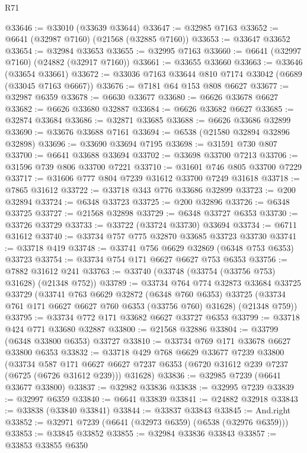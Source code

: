 \begin{lexlean}{R71}
\begin{coremodule}
@33646 := @33010 (@33639 @33644)
@33647 := @32985 @7163
@33652 := @6641 (@32987 @7160) (@21568 (@32885 @7160))
@33653 := @33647 @33652
@33654 := @32984 @33653
@33655 := @32995 @7163
@33660 := @6641 (@32997 @7160) (@24882 (@32917 @7160))
@33661 := @33655 @33660
@33663 := @33646 (@33654 @33661)
@33672 := @33036 @7163 @33644 @810 @7174 @33042 (@6689 (@33045 @7163 @6667))
@33676 := @7181 @64 @153 @808 @6627
@33677 := @32987 @6359
@33678 := @6630 @33677
@33680 := @6626 @33678 @6627
@33682 := @6626 @33680 @32887
@33684 := @6626 @33682 @6627
@33685 := @32874 @33684
@33686 := @32871 @33685
@33688 := @6626 @33686 @32899
@33690 := @33676 @33688 @7161
@33694 := @6538 (@21580 @32894 @32896 @32898)
@33696 := @33690 @33694 @7195
@33698 := @31591 @730 @807
@33700 := @6641 @33688 @33694
@33702 := @33698 @33700 @7213
@33706 := @31596 @739 @806 @33700 @7221
@33710 := @31601 @746 @805 @33700 @7229
@33717 := @31606 @777 @804 @7239 @31612 @33700 @7249 @31618
@33718 := @7865 @31612
@33722 := @33718 @343 @776 @33686 @32899
@33723 := @200 @32894
@33724 := @6348 @33723
@33725 := @200 @32896
@33726 := @6348 @33725
@33727 := @21568 @32898
@33729 := @6348 @33727 @6353
@33730 := @33726 @33729
@33733 := @33722 (@33724 @33730) @33694
@33734 := @6711 @31612
@33740 := @33734 @757 @775 @32870 @33685 @33723 @33730
@33741 := @33718 @419
@33748 := @33741 @756 @6629 @32869 (@6348 @753 @6353) @33723
@33754 := @33734 @754 @171 @6627 @6627 @753 @6353
@33756 := @7882 @31612 @241
@33763 := @33740 (@33748 (@33754 (@33756 @753) @31628) (@21348 @752))
@33789 := @33734
    @764
    @774
    @32873
    @33684
    @33725
    @33729
    (@33741
      @763
      @6629
      @32872
      (@6348 @760 @6353)
      @33725
      (@33734 @761 @171 @6627 @6627 @760 @6353 (@33756 @760) @31628)
      (@21348 @759))
@33795 := @33734 @772 @171 @33682 @6627 @33727 @6353
@33799 := @33718 @424 @771 @33680 @32887
@33800 := @21568 @32886
@33804 := @33799 (@6348 @33800 @6353) @33727
@33810 := @33734 @769 @171 @33678 @6627 @33800 @6353
@33832 := @33718
    @429
    @768
    @6629
    @33677
    @7239
    @33800
    (@33734
      @587
      @171
      @6627
      @6627
      @7237
      @6353
      (@6720 @31612 @239 @7237 (@6725 (@6726 @31612 @239)))
      @31628)
@33836 := @32985 @7239 (@6641 @33677 @33800)
@33837 := @32982 @33836
@33838 := @32995 @7239
@33839 := @32997 @6359
@33840 := @6641 @33839
@33841 := @24882 @32918
@33843 := @33838 (@33840 @33841)
@33844 := @33837 @33843
@33845 := And.right
@33852 := @32971 @7239 (@6641 (@32973 @6359) (@6538 (@32976 @6359)))
@33853 := @33845 @33852
@33855 := @32984 @33836 @33843
@33857 := @33853 @33855 @6350

\end{coremodule}
\end{lexlean}
